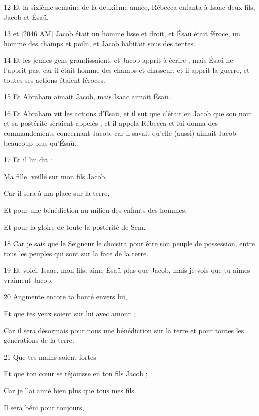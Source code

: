 \par 12 Et la sixième semaine de la deuxième année, Rébecca enfanta à Isaac deux fils, Jacob et Ésaü,
\par 13 et [2046 AM] Jacob était un homme lisse et droit, et Ésaü était féroce, un homme des champs et poilu, et Jacob habitait sous des tentes.
\par 14 Et les jeunes gens grandissaient, et Jacob apprit à écrire ; mais Ésaü ne l'apprit pas, car il était homme des champs et chasseur, et il apprit la guerre, et toutes ses actions étaient féroces.
\par 15 Et Abraham aimait Jacob, mais Isaac aimait Ésaü.
\par 16 Et Abraham vit les actions d'Ésaü, et il sut que c'était en Jacob que son nom et sa postérité seraient appelés ; et il appela Rébecca et lui donna des commandements concernant Jacob, car il savait qu'elle (aussi) aimait Jacob beaucoup plus qu'Ésaü.
\par 17 Et il lui dit :
\par    
\par     Ma fille, veille sur mon fils Jacob,  
\par     Car il sera à ma place sur la terre,  
\par     Et pour une bénédiction au milieu des enfants des hommes,  
\par     Et pour la gloire de toute la postérité de Sem.
\par    
\par 18 Car je sais que le Seigneur le choisira pour être son peuple de possession, entre tous les peuples qui sont sur la face de la terre.
\par 19 Et voici, Isaac, mon fils, aime Ésaü plus que Jacob, mais je vois que tu aimes vraiment Jacob.
\par    
\par 20 Augmente encore ta bonté envers lui,  
\par     Et que tes yeux soient sur lui avec amour ;  
\par     Car il sera désormais pour nous une bénédiction sur la terre et pour toutes les générations de la terre.
\par    
\par 21 Que tes mains soient fortes  
\par     Et que ton cœur se réjouisse en ton fils Jacob ;  
\par     Car je l'ai aimé bien plus que tous mes fils.
\par    
\par     Il sera béni pour toujours,  

